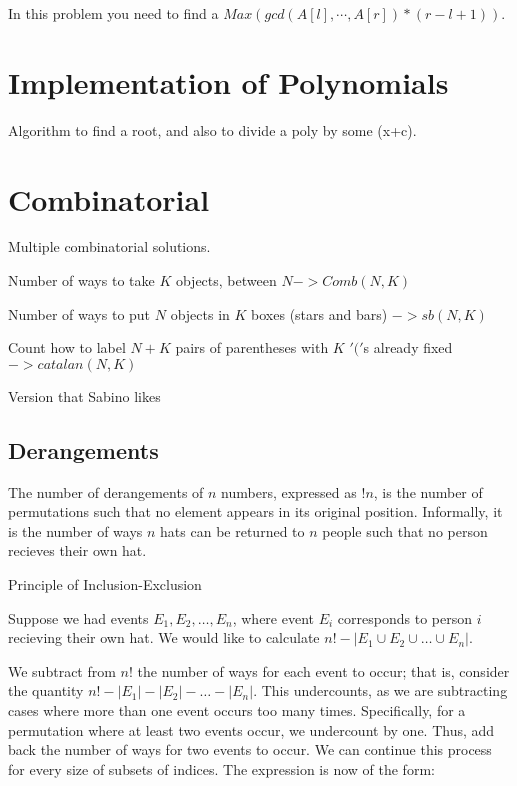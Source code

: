     In this problem you need to find a $Max(gcd(A[l],\cdots,A[r])*(r-l+1))$.
    
    \section{Implementation of Polynomials}
    Algorithm to find a root, and also to divide a poly by some (x+c).
    
    \section{Combinatorial}
    Multiple combinatorial solutions.
    
    Number of ways to take $K$ objects, between $N -> Comb(N,K)$
    
    Number of ways to put $N$ objects in $K$ boxes (stars and bars) $-> sb(N,K)$

    Count how to label $N + K$ pairs of parentheses with $K$ $'('$s already fixed $-> catalan(N,K)$
    
    
    Version that Sabino likes
    
    \subsection{Derangements}
    The number of derangements of $n$ numbers, expressed as $!n$, is the number of
    permutations such that no element appears in its original position. Informally,
    it is the number of ways $n$ hats can be returned to $n$ people such that no
    person recieves their own hat.
    
    Principle of Inclusion-Exclusion
    
    Suppose we had events $E_1, E_2, \dots, E_n$, where event $E_i$ corresponds to
    person $i$ recieving their own hat. We would like to calculate $n! - \lvert E_1 \cup E_2 \cup \dots \cup E_n \rvert$.
    
    We subtract from $n!$ the number of ways for each event to occur; that is,
    consider the quantity $n! - \lvert E_1 \rvert - \lvert E_2 \rvert - \dots - \lvert E_n \rvert$. This undercounts, as we are subtracting cases where more
    than one event occurs too many times. Specifically, for a permutation where at
    least two events occur, we undercount by one. Thus, add back the number of ways
    for two events to occur. We can continue this process for every size of subsets
    of indices. The expression is now of the form:
    
